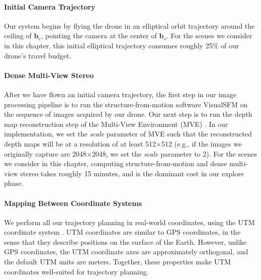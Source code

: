 \paragraph{Initial Camera Trajectory}
Our system begins by flying the drone in an elliptical orbit trajectory around the ceiling of $\mathbf{b}_c$, pointing the camera at the center of $\mathbf{b}_s$.
For the scenes we consider in this chapter, this initial elliptical trajectory consumes roughly 25\% of our drone's travel budget.

\paragraph{Dense Multi-View Stereo}
After we have flown an initial camera trajectory, the first step in our image processing pipeline is to run the structure-from-motion software VisualSFM \cite{wu:2013,wu:2007,wu:2011b,wu:2011a} on the sequence of images acquired by our drone.
Our next step is to run the depth map reconstruction step of the Multi-View Environment (MVE) \cite{fuhrmann:2015}.
In our implementation, we set the \emph{scale} parameter of MVE such that the reconstructed depth maps will be at a resolution of at least 512$\times$512 (e.g., if the images we originally capture are 2048$\times$2048, we set the \emph{scale} parameter to 2).
For the scenes we consider in this chapter, computing structure-from-motion and dense multi-view stereo takes roughly 15 minutes, and is the dominant cost in our explore phase.

\paragraph{Mapping Between Coordinate Systems}
We perform all our trajectory planning in real-world coordinates, using the UTM coordinate system \cite{usgs:2001}.
UTM coordinates are similar to GPS coordinates, in the sense that they describe positions on the surface of the Earth.
However, unlike GPS coordinates, the UTM coordinate axes are approximately orthogonal, and the default UTM units are meters.
Together, these properties make UTM coordinates well-suited for trajectory planning.


